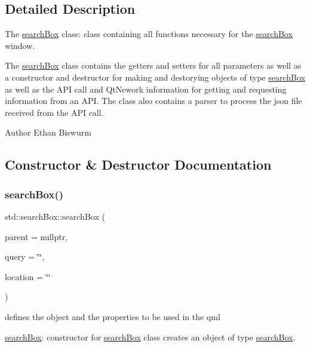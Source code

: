 \subsection{Detailed Description}
The \hyperlink{classstd_1_1searchBox}{search\+Box} class\+: class containing all functions necessary for the \hyperlink{classstd_1_1searchBox}{search\+Box} window. 

The \hyperlink{classstd_1_1searchBox}{search\+Box} class contains the getters and setters for all parameters as well as a constructor and destructor for making and destorying objects of type \hyperlink{classstd_1_1searchBox}{search\+Box} as well as the A\+PI call and Qt\+Nework information for getting and requesting information from an A\+PI. The class also contains a parser to process the json file received from the A\+PI call. \begin{DoxyAuthor}{Author}
Ethan Biswurm 
\end{DoxyAuthor}


\subsection{Constructor \& Destructor Documentation}
\mbox{\label{classstd_1_1searchBox_a8c14effb55526c2e064ada85d733bbb7}} 
\subsubsection{\texorpdfstring{search\+Box()}{searchBox()}}
{\footnotesize\ttfamily std\+::search\+Box\+::search\+Box (\begin{DoxyParamCaption}\item[{Q\+Widget $\ast$}]{parent = {\ttfamily nullptr},  }\item[{Q\+String}]{query = {\ttfamily \char`\"{}\char`\"{}},  }\item[{Q\+String}]{location = {\ttfamily \char`\"{}\char`\"{}} }\end{DoxyParamCaption})\hspace{0.3cm}{\ttfamily [explicit]}}



defines the object and the properties to be used in the qml 

\hyperlink{classstd_1_1searchBox}{search\+Box}\+: constructor for \hyperlink{classstd_1_1searchBox}{search\+Box} class creates an object of type \hyperlink{classstd_1_1searchBox}{search\+Box}.

